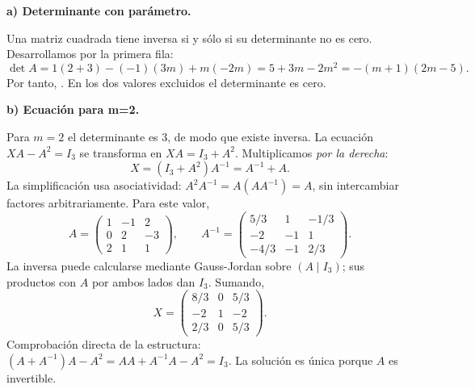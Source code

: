 \textbf{a) Determinante con parámetro.}\par\nopagebreak[4]
Una matriz cuadrada tiene inversa si y sólo si su determinante no es cero. Desarrollamos por la primera fila:
\[
\det A=1(2+3)-(-1)(3m)+m(-2m)
=5+3m-2m^2=-(m+1)(2m-5).
\]
Por tanto, . En los dos valores excluidos el determinante es cero.

\textbf{b) Ecuación para m=2.}\par\nopagebreak[4]
Para $m=2$ el determinante es 3, de modo que existe inversa. La ecuación $XA-A^2=I_3$ se transforma en $XA=I_3+A^2$. Multiplicamos \emph{por la derecha}:
\[
X=(I_3+A^2)A^{-1}=A^{-1}+A.
\]
La simplificación usa asociatividad: $A^2A^{-1}=A(AA^{-1})=A$, sin intercambiar factores arbitrariamente. Para este valor,
\[
A=\begin{pmatrix}1&-1&2\\0&2&-3\\2&1&1\end{pmatrix},\qquad
A^{-1}=\begin{pmatrix}5/3&1&-1/3\\-2&-1&1\\-4/3&-1&2/3\end{pmatrix}.
\]
La inversa puede calcularse mediante Gauss-Jordan sobre $(A\mid I_3)$; sus productos con $A$ por ambos lados dan $I_3$. Sumando,
\[
\boxed{X=\begin{pmatrix}8/3&0&5/3\\-2&1&-2\\2/3&0&5/3\end{pmatrix}.}
\]
Comprobación directa de la estructura: $(A+A^{-1})A-A^2=AA+A^{-1}A-A^2=I_3$. La solución es única porque $A$ es invertible.
